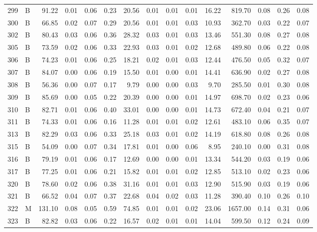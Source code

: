 \begin{table}[ht]
\begin{tabular}{rlrrrrrrrrrrrrr}
  299 & B & 91.22 & 0.01 & 0.06 & 0.23 & 20.56 & 0.01 & 0.01 & 0.01 & 16.22 & 819.70 & 0.08 & 0.26 & 0.08 \\ 
  300 & B & 66.85 & 0.02 & 0.07 & 0.29 & 20.56 & 0.01 & 0.01 & 0.03 & 10.93 & 362.70 & 0.03 & 0.22 & 0.07 \\ 
  302 & B & 80.43 & 0.03 & 0.06 & 0.36 & 28.32 & 0.03 & 0.01 & 0.03 & 13.46 & 551.30 & 0.08 & 0.27 & 0.08 \\ 
  305 & B & 73.59 & 0.02 & 0.06 & 0.33 & 22.93 & 0.03 & 0.01 & 0.02 & 12.68 & 489.80 & 0.06 & 0.22 & 0.08 \\ 
  306 & B & 74.23 & 0.01 & 0.06 & 0.25 & 18.21 & 0.02 & 0.01 & 0.03 & 12.44 & 476.50 & 0.05 & 0.32 & 0.07 \\ 
  307 & B & 84.07 & 0.00 & 0.06 & 0.19 & 15.50 & 0.01 & 0.00 & 0.01 & 14.41 & 636.90 & 0.02 & 0.27 & 0.08 \\ 
  308 & B & 56.36 & 0.00 & 0.07 & 0.17 & 9.79 & 0.00 & 0.00 & 0.03 & 9.70 & 285.50 & 0.01 & 0.30 & 0.08 \\ 
  309 & B & 85.69 & 0.00 & 0.05 & 0.22 & 20.39 & 0.00 & 0.00 & 0.01 & 14.97 & 698.70 & 0.02 & 0.23 & 0.06 \\ 
  310 & B & 82.71 & 0.01 & 0.06 & 0.40 & 33.01 & 0.00 & 0.00 & 0.01 & 14.73 & 672.40 & 0.04 & 0.21 & 0.07 \\ 
  311 & B & 74.33 & 0.01 & 0.06 & 0.16 & 11.28 & 0.01 & 0.01 & 0.02 & 12.61 & 483.10 & 0.06 & 0.35 & 0.07 \\ 
  313 & B & 82.29 & 0.03 & 0.06 & 0.33 & 25.18 & 0.03 & 0.01 & 0.02 & 14.19 & 618.80 & 0.08 & 0.26 & 0.08 \\ 
  315 & B & 54.09 & 0.00 & 0.07 & 0.34 & 17.81 & 0.01 & 0.00 & 0.06 & 8.95 & 240.10 & 0.00 & 0.31 & 0.08 \\ 
  316 & B & 79.19 & 0.01 & 0.06 & 0.17 & 12.69 & 0.00 & 0.00 & 0.01 & 13.34 & 544.20 & 0.03 & 0.19 & 0.06 \\ 
  317 & B & 77.25 & 0.01 & 0.06 & 0.21 & 15.82 & 0.01 & 0.01 & 0.02 & 12.85 & 513.10 & 0.02 & 0.23 & 0.06 \\ 
  320 & B & 78.60 & 0.02 & 0.06 & 0.38 & 31.16 & 0.01 & 0.01 & 0.03 & 12.90 & 515.90 & 0.03 & 0.19 & 0.06 \\ 
  321 & B & 66.52 & 0.04 & 0.07 & 0.37 & 22.68 & 0.04 & 0.02 & 0.03 & 11.28 & 390.40 & 0.10 & 0.26 & 0.10 \\ 
  322 & M & 131.10 & 0.08 & 0.05 & 0.59 & 74.85 & 0.01 & 0.01 & 0.02 & 23.06 & 1657.00 & 0.14 & 0.31 & 0.06 \\ 
  323 & B & 82.82 & 0.03 & 0.06 & 0.22 & 16.57 & 0.02 & 0.01 & 0.01 & 14.04 & 599.50 & 0.12 & 0.24 & 0.09 \\ 

\end{tabular}
\end{table}
